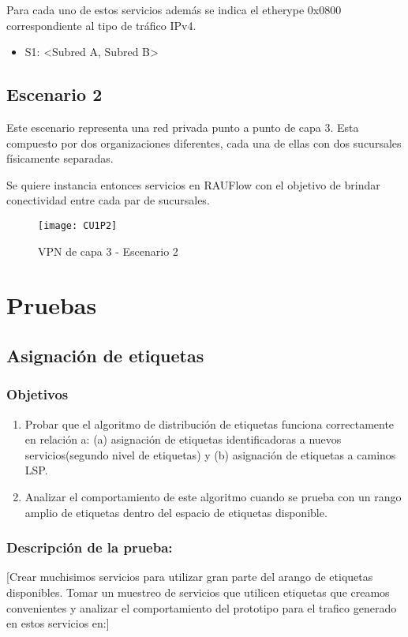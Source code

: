 Para cada uno de estos servicios adem\'as se indica el etherype 0x0800 correspondiente al tipo de tr\'afico IPv4.

\begin{itemize}
\item S1: <Subred A, Subred B>
\end{itemize} 
\newpage
\subsection{Escenario 2}

Este escenario representa una red privada punto a punto de capa 3. Esta compuesto por dos organizaciones diferentes, cada una de ellas con dos sucursales f\'isicamente separadas.

Se quiere instancia entonces servicios en RAUFlow con el objetivo de brindar conectividad entre cada par de sucursales.
 
\begin{figure}[ht!] 
\centering    
\texttt{[image: CU1P2]}
\caption[VPN de capa 3 - Escenario 2]{VPN de capa 3 - Escenario 2}
\label{fig:CUP2}
\end{figure}

\section{Pruebas}

\subsection{Asignación de etiquetas}

\subsubsection{Objetivos}
\begin{enumerate}
\item Probar que el algoritmo de distribución de etiquetas funciona correctamente en relación a: (a) asignación de etiquetas identificadoras a nuevos servicios(segundo nivel de etiquetas) y (b) asignación de etiquetas a caminos LSP.
\item Analizar el comportamiento de este algoritmo cuando se prueba con un rango amplio de etiquetas dentro del espacio de etiquetas disponible.
\end{enumerate}

\subsubsection{Descripción de la prueba:}
[Crear muchisimos servicios para utilizar gran parte del arango de etiquetas disponibles. Tomar un muestreo de servicios que utilicen etiquetas que creamos convenientes y analizar el comportamiento del prototipo para el trafico generado en estos servicios en:]

